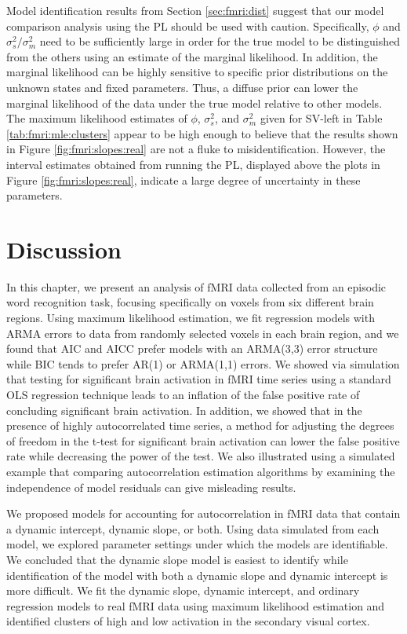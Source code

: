 Model identification results from Section \ref{sec:fmri:dist} suggest that our model comparison analysis using the PL should be used with caution. Specifically, $\phi$ and $\sigma^2_s / \sigma^2_m$ need to be sufficiently large in order for the true model to be distinguished from the others using an estimate of the marginal likelihood. In addition, the marginal likelihood can be highly sensitive to specific prior distributions on the unknown states and fixed parameters. Thus, a diffuse prior can lower the marginal likelihood of the data under the true model relative to other models. The maximum likelihood estimates of $\phi$, $\sigma^2_s$, and $\sigma^2_m$ given for SV-left in Table \ref{tab:fmri:mle:clusters} appear to be high enough to believe that the results shown in Figure \ref{fig:fmri:slopes:real} are not a fluke to misidentification. However, the interval estimates obtained from running the PL, displayed above the plots in Figure \ref{fig:fmri:slopes:real}, indicate a large degree of uncertainty in these parameters.

\section{Discussion \label{sec:fmri:discussion}}

In this chapter, we present an analysis of fMRI data collected from an episodic word recognition task, focusing specifically on voxels from six different brain regions. Using maximum likelihood estimation, we fit regression models with ARMA errors to data from randomly selected voxels in each brain region, and we found that AIC and AICC prefer models with an ARMA(3,3) error structure while BIC tends to prefer AR(1) or ARMA(1,1) errors. We showed via simulation that testing for significant brain activation in fMRI time series using a standard OLS regression technique leads to an inflation of the false positive rate of concluding significant brain activation. In addition, we showed that in the presence of highly autocorrelated time series, a method for adjusting the degrees of freedom in the t-test for significant brain activation can lower the false positive rate while decreasing the power of the test. We also illustrated using a simulated example that comparing autocorrelation estimation algorithms by examining the independence of model residuals can give misleading results.

We proposed models for accounting for autocorrelation in fMRI data that contain a dynamic intercept, dynamic slope, or both. Using data simulated from each model, we explored parameter settings under which the models are identifiable. We concluded that the dynamic slope model is easiest to identify while identification of the model with both a dynamic slope and dynamic intercept is more difficult. We fit the dynamic slope, dynamic intercept, and ordinary regression models to real fMRI data using maximum likelihood estimation and identified clusters of high and low activation in the secondary visual cortex.

